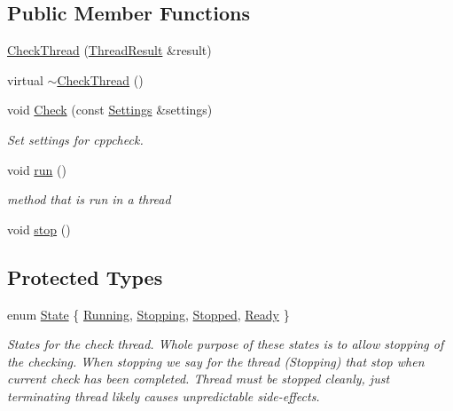 \subsection*{Public Member Functions}
\begin{DoxyCompactItemize}
\item 
\hyperlink{class_check_thread_a7dc705303cd3d11f83b836b830d34fbe}{Check\-Thread} (\hyperlink{class_thread_result}{Thread\-Result} \&result)
\item 
virtual \hyperlink{class_check_thread_a3f34686541032d4cd069e665cee1253d}{$\sim$\-Check\-Thread} ()
\item 
void \hyperlink{class_check_thread_a50b9ae05253c45f9a5486adaf449a8ce}{Check} (const \hyperlink{class_settings}{Settings} \&settings)
\begin{DoxyCompactList}\small\item\em Set settings for cppcheck. \end{DoxyCompactList}\item 
void \hyperlink{class_check_thread_a47710a9936666414e4e4229b68dab739}{run} ()
\begin{DoxyCompactList}\small\item\em method that is run in a thread \end{DoxyCompactList}\item 
void \hyperlink{class_check_thread_aa8a93c58196419750d00fe1c90fe9d84}{stop} ()
\end{DoxyCompactItemize}
\subsection*{Protected Types}
\begin{DoxyCompactItemize}
\item 
enum \hyperlink{class_check_thread_a39bfc27bb753492ce57fc6d5aa17e664}{State} \{ \hyperlink{class_check_thread_a39bfc27bb753492ce57fc6d5aa17e664a314bd1a73a4907b999389dbdb7973c9a}{Running}, 
\hyperlink{class_check_thread_a39bfc27bb753492ce57fc6d5aa17e664a593fbf32cdcf1880beac5bd9e537e31c}{Stopping}, 
\hyperlink{class_check_thread_a39bfc27bb753492ce57fc6d5aa17e664a9e9c87579d7d1c147e883887ce529dac}{Stopped}, 
\hyperlink{class_check_thread_a39bfc27bb753492ce57fc6d5aa17e664ac26915ebfa55133ec9dba55af7eeac24}{Ready}
 \}
\begin{DoxyCompactList}\small\item\em States for the check thread. Whole purpose of these states is to allow stopping of the checking. When stopping we say for the thread (Stopping) that stop when current check has been completed. Thread must be stopped cleanly, just terminating thread likely causes unpredictable side-\/effects. \end{DoxyCompactList}\end{DoxyCompactItemize}
